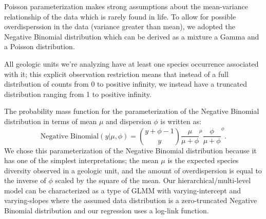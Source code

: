 \documentclass[12pt,letterpaper]{article}
\begin{document}
Poisson parameterization makes strong assumptions about the mean-variance relationship of the data which is rarely found in life. To allow for possible overdisperssion in the data (variance greater than mean), we adopted the Negative Binomial distribution which can be derived as a mixture a Gamma and a Poisson distribution.

All geologic units we're analyzing have at least one species occurrence associated with it; this explicit observation restriction means that instead of a full distribution of counts from 0 to positive infinity, we instead have a truncated distribution ranging from 1 to positive infinity.

The probability mass function for the parameterization of the Negative Binomial distribution in terms of mean \(\mu\) and dispersion \(\phi\) is written as:
\begin{equation}
  \text{Negative Binomial}(y | \mu, \phi) = \binom{y + \phi - 1}{y} \frac{\mu}{\mu + \phi}^{\mu} \frac{\phi}{\mu + \phi}^{\phi}.
\end{equation}
We chose this parameterization of the Negative Binomial distribution because it has one of the simplest interpretations; the mean \(\mu\) is the expected species diversity observed in a geologic unit, and the amount of overdispersion is equal to the inverse of \(\phi\) scaled by the square of the mean. Our hierarchical/multi-level model can be characterized as a type of GLMM with varying-intercept and varying-slopes where the assumed data distribution is a zero-truncated Negative Binomial distribution and our regression uses a log-link function.
\end{document}
